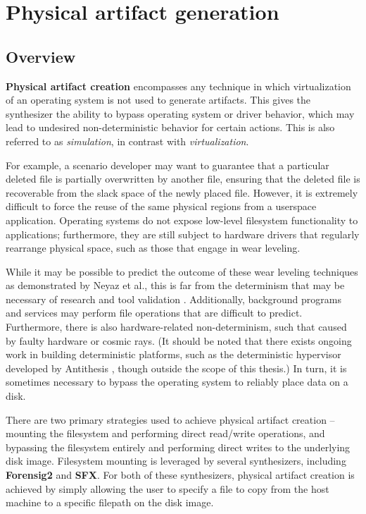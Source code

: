 \documentclass[letterpaper,12pt]{report}
\begin{document}
\section{Physical artifact
generation}\label{physical-artifact-generation}

\subsection{Overview}\label{overview-1}

\textbf{Physical artifact creation} encompasses any technique in which
virtualization of an operating system is not used to generate artifacts.
This gives the synthesizer the ability to bypass operating system or
driver behavior, which may lead to undesired non-deterministic behavior
for certain actions. This is also referred to as \emph{simulation}, in
contrast with \emph{virtualization}.

For example, a scenario developer may want to guarantee that a
particular deleted file is partially overwritten by another file,
ensuring that the deleted file is recoverable from the slack space of
the newly placed file. However, it is extremely difficult to force the
reuse of the same physical regions from a userspace application.
Operating systems do not expose low-level filesystem functionality to
applications; furthermore, they are still subject to hardware drivers
that regularly rearrange physical space, such as those that engage in
wear leveling.

While it may be possible to predict the outcome of these wear leveling
techniques as demonstrated by Neyaz et al., this is far from the
determinism that may be necessary of research and tool validation
\cite{neyazForensicAnalysisWear2018}. Additionally, background
programs and services may perform file operations that are difficult to
predict. Furthermore, there is also hardware-related non-determinism,
such that caused by faulty hardware or cosmic rays. (It should be noted
that there exists ongoing work in building deterministic platforms, such
as the deterministic hypervisor developed by Antithesis
\cite{pshenichkinYouThinkYou2024}, though outside the scope of this
thesis.) In turn, it is sometimes necessary to bypass the operating
system to reliably place data on a disk.

There are two primary strategies used to achieve physical artifact
creation -- mounting the filesystem and performing direct read/write
operations, and bypassing the filesystem entirely and performing direct
writes to the underlying disk image. Filesystem mounting is leveraged by
several synthesizers, including \textbf{Forensig2} and \textbf{SFX}. For
both of these synthesizers, physical artifact creation is achieved by
simply allowing the user to specify a file to copy from the host machine
to a specific filepath on the disk image.
\end{document}
